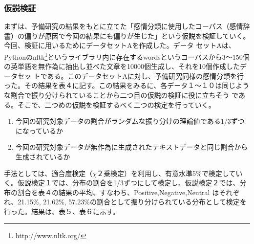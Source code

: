 \documentclass[uplatex,11pt]{jsarticle}
\begin{document}
\subsubsection{仮説検証}
まずは、予備研究の結果をもとに立てた「感情分類に使用したコーパス（感情辞書）の偏りが原因で今回の結果にも偏りが生じた」という仮説を検証していく。今回、検証に用いるためにデータセットAを作成した。データ
セットAは、Pythonのnltk\footnote{http://www.nltk.org/}というライブラリ内に存在するwordsというコーパスから3～150個の英単語を無作為に抽出し並べた文章を10000個生成し、それを10個作成したデータセッ
トである。このデータセットAに対し、予備研究同様の感情分類を行った。その結果を表４に記す。この結果をみるに、各データ１～１０は同じような割合で振り分けられていることから二つ目の仮説の検証に役に立ちそう
である。そこで、二つめの仮説を検証するべく二つの検定を行っていく。
\begin{enumerate}
    \item 今回の研究対象データの割合がランダムな振り分けの理論値である1/3ずつになっているか
    \item 今回の研究対象データが無作為に生成されたテキストデータと同じ割合から生成されているか
\end{enumerate}
手法としては、適合度検定（$\chi$２乗検定）を利用し、有意水準5\%で検定していく。仮説検定１では、分布の割合を1/3ずつにして検定し、仮説検定２では、分布の割合を表４の結果の平均、すなわち、Positive,Negative,Neutral
はそれぞれ、21.15\%, 21.62\%, 57.23\%の割合として振り分けられている分布として検定を行った。結果は、表５、表６に示す。
\end{document}
